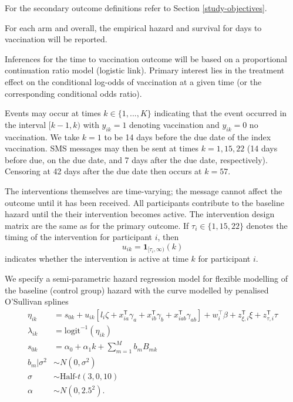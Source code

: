 \documentclass[
  bibliography=totoc]{scrreprt}
\begin{document}
For the secondary outcome definitions refer to Section \ref{study-objectives}.

For each arm and overall, the empirical hazard and survival for days to vaccination will be reported.

Inferences for the time to vaccination outcome will be based on a proportional continuation ratio model (logistic link).
Primary interest lies in the treatment effect on the conditional log-odds of vaccination at a given time (or the corresponding conditional odds ratio).

Events may occur at times \(k\in\{1,...,K\}\) indicating that the event occurred in the interval \([k-1, k)\) with \(y_{ik}=1\) denoting vaccination and \(y_{ik}=0\) no vaccination.
We take \(k=1\) to be 14 days before the due date of the index vaccination.
SMS messages may then be sent at times \(k=1, 15, 22\) (14 days before due, on the due date, and 7 days after the due date, respectively).
Censoring at 42 days after the due date then occurs at \(k=57\).

The interventions themselves are time-varying; the message cannot affect the outcome until it has been received.
All participants contribute to the baseline hazard until the their intervention becomes active.
The intervention design matrix are the same as for the primary outcome.
If \(\tau_i\in\{1,15,22\}\) denotes the timing of the intervention for participant \(i\), then
\[
u_{ik} = \mathbf{1}_{[\tau_i, \infty)}(k)
\]
indicates whether the intervention is active at time \(k\) for participant \(i\).

We specify a semi-parametric hazard regression model for flexible modelling of the baseline (control group) hazard with the curve modelled by penalised O'Sullivan splines \citep{eilers1996, currie2002, wand2008}
\[
\begin{aligned}
\eta_{ik} &= s_{0k} + u_{ik}\left[l_i\zeta +  x_{ia}^\mathsf{T}\gamma_a + x_{ib}^\mathsf{T}\gamma_b + x_{iab}^\mathsf{T}\gamma_{ab} \right] + w_i^\top\beta + z^\mathsf{T}_{\xi,i}\xi + z^\mathsf{T}_{\tau,i}\tau \\
\lambda_{ik} &= \text{logit}^{-1}(\eta_{ik}) \\
s_{0k} &= \alpha_{0} + \alpha_{1} k + \textstyle\sum_{m=1}^M b_{m} B_{mk} \\
b_m|\sigma^2 &\sim N(0,\sigma^2) \\
\sigma &\sim \text{Half-}t(3, 0, 10) \\
\alpha &\sim N(0,2.5^2).
\end{aligned}
\]
\end{document}
